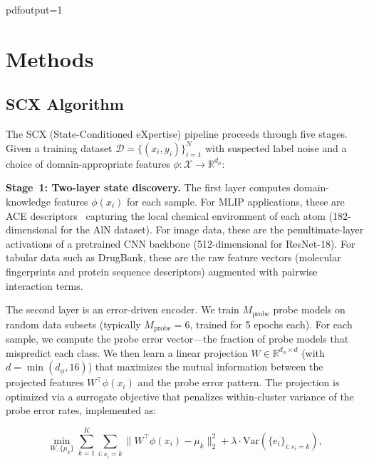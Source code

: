 pdfoutput=1
%

\section{Methods}

\subsection{SCX Algorithm}

The SCX (State-Conditioned eXpertise) pipeline proceeds through five stages. Given a training dataset $\mathcal{D} = \{(x_i, y_i)\}_{i=1}^N$ with suspected label noise and a choice of domain-appropriate features $\phi \colon \mathcal{X} \to \mathbb{R}^{d_\phi}$:

\textbf{Stage~1: Two-layer state discovery.} The first layer computes domain-knowledge features $\phi(x_i)$ for each sample. For MLIP applications, these are ACE descriptors~\cite{drautz2019ace} capturing the local chemical environment of each atom (182-dimensional for the AlN dataset). For image data, these are the penultimate-layer activations of a pretrained CNN backbone (512-dimensional for ResNet-18). For tabular data such as DrugBank, these are the raw feature vectors (molecular fingerprints and protein sequence descriptors) augmented with pairwise interaction terms.

The second layer is an error-driven encoder. We train $M_{\mathrm{probe}}$ probe models on random data subsets (typically $M_{\mathrm{probe}} = 6$, trained for 5 epochs each). For each sample, we compute the probe error vector---the fraction of probe models that mispredict each class. We then learn a linear projection $W \in \mathbb{R}^{d_\phi \times d}$ (with $d = \min(d_\phi, 16)$) that maximizes the mutual information between the projected features $W^\top \phi(x_i)$ and the probe error pattern. The projection is optimized via a surrogate objective that penalizes within-cluster variance of the probe error rates, implemented as:

\begin{equation}
\min_{W, \{\mu_k\}} \sum_{k=1}^K \sum_{i: s_i = k} \bigl\| W^\top \phi(x_i) - \mu_k \bigr\|_2^2 + \lambda \cdot \mathrm{Var}(\{e_i\}_{i: s_i = k}),
\label{eq:encoder}
\end{equation}

